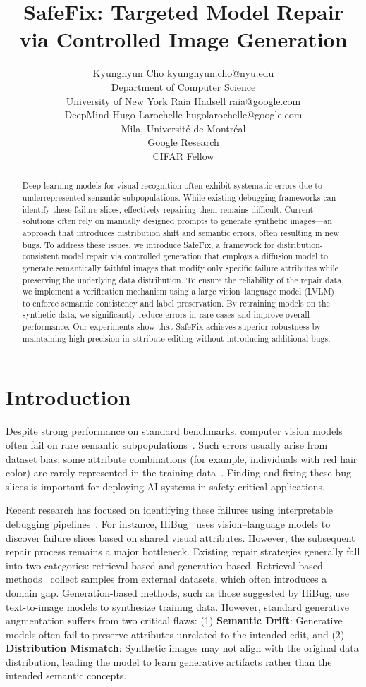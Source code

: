 \documentclass[10pt]{article} %
\title{SafeFix: Targeted Model Repair via Controlled Image Generation}
\author{\name Kyunghyun Cho \email kyunghyun.cho@nyu.edu \\
      \addr Department of Computer Science\\
      University of New York
      \AND
      \name Raia Hadsell \email raia@google.com \\
      \addr DeepMind
      \AND
      \name Hugo Larochelle \email hugolarochelle@google.com\\
      \addr Mila, Universit\'e de Montr\'eal \\
      Google Research\\
      CIFAR Fellow}
\newcommand{\model}{SafeFix\xspace}
\newcommand{\hibug}{HiBug\xspace}
\begin{document}
\maketitle

\begin{abstract}
Deep learning models for visual recognition often exhibit systematic errors due to underrepresented semantic subpopulations. While existing debugging frameworks can identify these failure slices, effectively repairing them remains difficult. Current solutions often rely on manually designed prompts to generate synthetic images—an approach that introduces distribution shift and semantic errors, often resulting in new bugs. To address these issues, we introduce \model, a framework for distribution-consistent model repair via controlled generation that employs a diffusion model to generate semantically faithful images that modify only specific failure attributes while preserving the underlying data distribution. To ensure the reliability of the repair data, we implement a verification mechanism using a large vision--language model (LVLM) to enforce semantic consistency and label preservation. By retraining models on the synthetic data, we significantly reduce errors in rare cases and improve overall performance. Our experiments show that \model achieves superior robustness by maintaining high precision in attribute editing without introducing additional bugs.
\end{abstract}

\section{Introduction}
Despite strong performance on standard benchmarks, computer vision models often fail on rare semantic subpopulations~\citep{barbu2019objectnet,gao2023adaptive,leclerc20223db}. Such errors usually arise from dataset bias: some attribute combinations (for example, individuals with red hair color) are rarely represented in the training data~\citep{buolamwini2018gender}. Finding and fixing these bug slices is important for deploying AI systems in safety-critical applications.

Recent research has focused on identifying these failures using interpretable debugging pipelines~\citep{gao2023adaptive,chen2023hibug,singla2024data}. For instance, \hibug~\citep{chen2023hibug} uses vision--language models to discover failure slices based on shared visual attributes. However, the subsequent repair process remains a major bottleneck. Existing repair strategies generally fall into two categories: retrieval-based and generation-based. Retrieval-based methods~\citep{gao2023adaptive,singla2024data} collect samples from external datasets, which often introduces a domain gap. Generation-based methods, such as those suggested by \hibug, use text-to-image models to synthesize training data. However, standard generative augmentation suffers from two critical flaws: (1) \textbf{Semantic Drift}: Generative models often fail to preserve attributes unrelated to the intended edit, and (2) \textbf{Distribution Mismatch}: Synthetic images may not align with the original data distribution, leading the model to learn generative artifacts rather than the intended semantic concepts.
\end{document}
